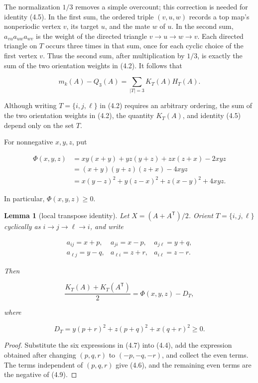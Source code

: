 \documentclass[11pt]{article}
\newtheorem{lemma}[theorem]{Lemma}
\theoremstyle{remark}
\begin{document}
The normalization $1/3$ removes a simple overcount; this correction is needed
for identity (4.5). In the first sum, the ordered triple $(v,u,w)$ records a
top map's nonperiodic vertex $v$, its target $u$, and the mate $w$ of $u$. In
the second sum,
$a_{vu}a_{uw}a_{wv}$ is the weight of the directed triangle
$v\to u\to w\to v$. Each directed triangle on $T$ occurs three times in
that sum, once for each cyclic choice of the first vertex $v$. Thus the
second sum, after multiplication by $1/3$, is exactly the sum of the two
orientation weights in (4.2). It follows that

\[
m_k(A)-Q_3(A)=\sum_{|T|=3}K_T(A)H_T(A).
\tag{4.5}
\]

Although writing $T=\{i,j,\ell\}$ in (4.2) requires an arbitrary ordering,
the sum of the two orientation weights in (4.2), the quantity $K_T(A)$, and
identity (4.5) depend only on the set $T$.

For nonnegative $x,y,z$, put

\[
\begin{aligned}
\Phi(x,y,z)
&=xy(x+y)+yz(y+z)+zx(z+x)-2xyz\\
&=(x+y)(y+z)(z+x)-4xyz\\
&=x(y-z)^2+y(z-x)^2+z(x-y)^2+4xyz.
\end{aligned}
\tag{4.6}
\]

In particular, $\Phi(x,y,z)\ge0$.

\begin{lemma}[local transpose identity]
Let
$X=(A+A^{\mathsf T})/2$. Orient $T=\{i,j,\ell\}$ cyclically as
$i\to j\to\ell\to i$, and write

\[
\begin{array}{lll}
a_{ij}=x+p,&a_{ji}=x-p,&a_{j\ell}=y+q,\\
a_{\ell j}=y-q,&a_{\ell i}=z+r,&a_{i\ell}=z-r.
\end{array}
\tag{4.7}
\]

Then

\[
\frac{K_T(A)+K_T(A^{\mathsf T})}{2}
=\Phi(x,y,z)-D_T,
\tag{4.8}
\]

where

\[
D_T=y(p+r)^2+z(p+q)^2+x(q+r)^2\ge0.
\tag{4.9}
\]

\end{lemma}

\begin{proof}
Substitute the six expressions in (4.7) into (4.4), add the
expression obtained after changing $(p,q,r)$ to $(-p,-q,-r)$, and collect
the even terms. The terms independent of $(p,q,r)$ give (4.6), and the
remaining even terms are the negative of (4.9).
\end{proof}
\end{document}
